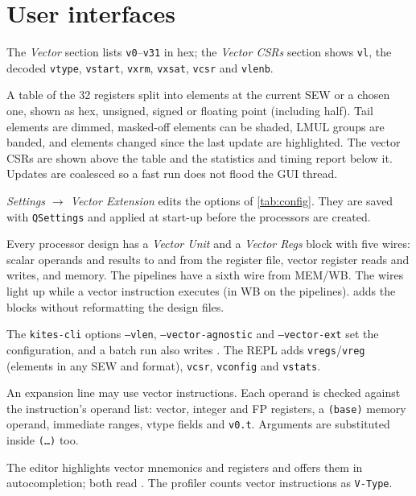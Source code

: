 \documentclass[11pt]{article}
\begin{document}
\section{User interfaces}\label{sec:ui}

\begin{description}[style=nextline,leftmargin=0.6cm,font=\sffamily\bfseries\color{kblue}]
\item[Register panel] The \emph{Vector} section lists \texttt{v0}--\texttt{v31} in hex; the
  \emph{Vector CSRs} section shows \texttt{vl}, the decoded \texttt{vtype}, \texttt{vstart},
  \texttt{vxrm}, \texttt{vxsat}, \texttt{vcsr} and \texttt{vlenb}.
\item[Vector tab] A table of the 32 registers split into elements at the current SEW or a chosen
  one, shown as hex, unsigned, signed or floating point (including half). Tail elements are
  dimmed, masked-off elements can be shaded, LMUL groups are banded, and elements changed since
  the last update are highlighted. The vector CSRs are shown above the table and the statistics
  and timing report below it. Updates are coalesced so a fast run does not flood the GUI thread.
\item[Settings] \emph{Settings $\rightarrow$ Vector Extension} edits the options of
  \cref{tab:config}. They are saved with \texttt{QSettings} and applied at start-up before the
  processors are created.
\item[Circuit view] Every processor design has a \emph{Vector Unit} and a \emph{Vector Regs}
  block with five wires: scalar operands and results to and from the register file, vector
  register reads and writes, and memory. The pipelines have a sixth wire from MEM/WB. The wires
  light up while a vector instruction executes (in WB on the pipelines).
   adds the blocks without reformatting the
  design files.
\item[CLI] The \texttt{kites-cli} options \texttt{--vlen}, \texttt{--vector-agnostic} and
  \texttt{--vector-ext} set the configuration, and a batch run also writes
  . The REPL adds
  \texttt{vregs}/\texttt{vreg} (elements in any SEW and format), \texttt{vcsr},
  \texttt{vconfig} and \texttt{vstats}.
\item[Custom pseudo-instructions] An expansion line may use vector instructions. Each operand is
  checked against the instruction's operand list: vector, integer and FP registers, a
  \texttt{(base)} memory operand, immediate ranges, vtype fields and \texttt{v0.t}. Arguments
  are substituted inside \texttt{(\ldots)} too.
\item[Editor] The editor highlights vector mnemonics and registers and offers them in
  autocompletion; both read . The profiler counts
  vector instructions as \texttt{V-Type}.
\end{description}
\end{document}
